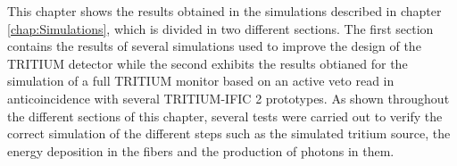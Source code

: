 This chapter shows the results obtained in the simulations described in chapter \ref{chap:Simulations}, which is divided in two different sections. The first section contains the results of several simulations used to improve the design of the TRITIUM detector while the second exhibits the results obtianed for the simulation of a full TRITIUM monitor based on an active veto read in anticoincidence with several TRITIUM-IFIC 2 prototypes. As shown throughout the different sections of this chapter, several tests were carried out to verify the correct simulation of the different steps such as the simulated tritium source, the energy deposition in the fibers and the production of photons in them.